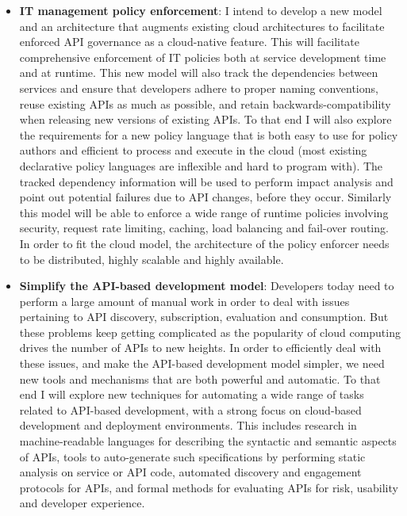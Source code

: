\begin{itemize}
\item {\bf IT management policy enforcement}: I intend to develop a new
model and an architecture that augments existing cloud architectures to
facilitate enforced API governance as a cloud-native feature. This will
facilitate comprehensive enforcement of IT policies both at service
development time and at runtime. This new model will also track the dependencies
between services and ensure that developers adhere to proper naming conventions,
reuse existing APIs as much as possible, and retain backwards-compatibility when
releasing new versions of existing APIs. To that end I will also explore the
requirements for a new policy language that is both easy to use for policy authors
and efficient to process and execute in the cloud (most existing
declarative policy languages are inflexible and hard to program with). The tracked
dependency information will be used to perform impact analysis and point
out potential failures due to API changes, before they occur. Similarly this
model will be able to enforce a wide range of runtime policies involving security,
request rate limiting, caching, load balancing and fail-over routing. In order to fit the
cloud model, the architecture of the policy enforcer needs to be distributed, highly
scalable and highly available.

\item {\bf Simplify the API-based development model}: Developers today need to perform
a large amount of manual work in order to deal with issues pertaining to API discovery,
subscription, evaluation and consumption. But these problems keep getting complicated
as the popularity of cloud computing drives the number of APIs to new heights. In order to
efficiently deal with these issues, and make the API-based development model
simpler, we need new tools and mechanisms that are both powerful and automatic. To
that end I will explore new techniques for automating a wide range of tasks
related to API-based development, with a strong focus on cloud-based development and
deployment environments. This includes research in machine-readable languages for describing
the syntactic and semantic aspects of APIs, tools to auto-generate such specifications by
performing static analysis on service or API code, automated discovery and engagement
protocols for APIs, and formal methods for evaluating APIs for risk, usability and 
developer experience.


\end{itemize}
